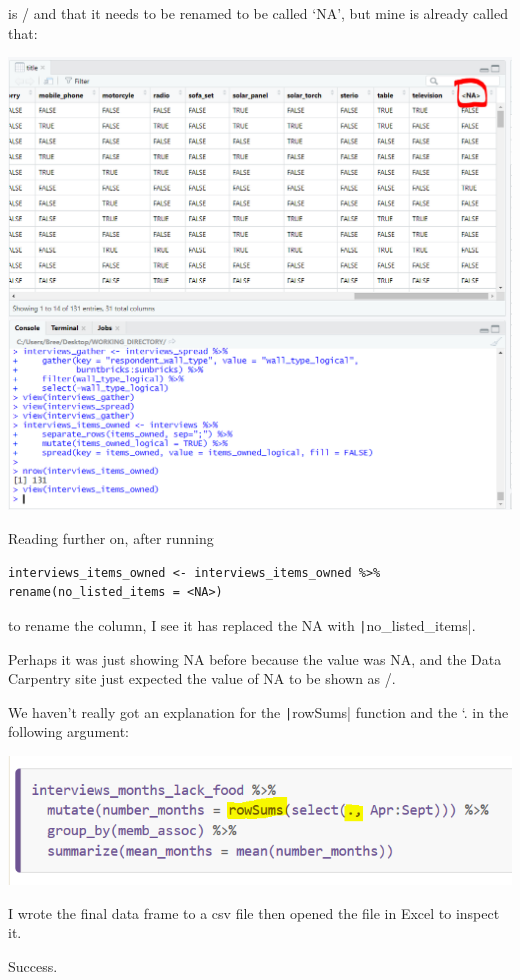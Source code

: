 \documentclass{article}
\begin{document}
is / and that it needs to be renamed to be called `NA', but mine is already called that:

\includegraphics[width=1.0\textwidth]{rstudio_24.PNG}

Reading further on, after running

\begin{verbatim}
interviews_items_owned <- interviews_items_owned %>%
rename(no_listed_items = <NA>)
\end{verbatim}

to rename the column, I see it has replaced the NA with \texttt|no_listed_items|.

Perhaps it was just showing NA before because the value was NA, and the Data Carpentry site just expected the value of NA to be shown as /.

{\item We haven’t really got an explanation for the \texttt|rowSums| function and the `. in the following argument:

\includegraphics[width=1.0\textwidth]{rstudio_25.PNG}

\item I wrote the final data frame to a csv file then opened the file in Excel to inspect it. \item Success.}
\end{document}
